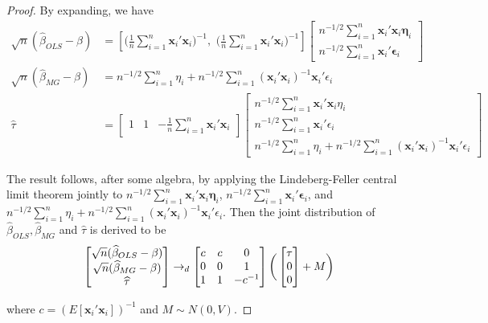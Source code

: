 \begin{proof}
By expanding, we have 
\begin{align*}
\sqrt{n} (\widehat{\beta}_{OLS} - \beta) & =  \left[\bigg(\frac{1}{n}\sum_{i=1}^{n} \mathbf{x}_i'  \mathbf{x}_i\bigg)^{-1}, \,\, \bigg(\frac{1}{n}\sum_{i=1}^{n} \mathbf{x}_i'  \mathbf{x}_i\bigg)^{-1} \right] \begin{bmatrix}
n^{-1/2}\sum_{i=1}^{n} \mathbf{x}_i'\mathbf{x}_i\mathbf{\eta}_i   \\
n^{-1/2}\sum_{i=1}^{n} \mathbf{x}_i'\mathbf{\epsilon}_i   
\end{bmatrix} \\
\sqrt{n} (\widehat{\beta}_{MG} - \beta)  &= n^{-1/2} \sum_{i=1}^n \eta_i + n^{-1/2} \sum_{i=1}^n (\mathbf{x}_i'\mathbf{x}_i)^{-1} \mathbf{x}_i'\epsilon_i \\
\widehat{\tau}  &=  \begin{bmatrix}
1 & 1& -\frac{1}{n}\sum_{i=1}^n \mathbf{x}_i'\mathbf{x}_i
\end{bmatrix} \begin{bmatrix}
n^{-1/2} \sum_{i=1}^n \mathbf{x}_i'\mathbf{x}_i \eta_i \\
n^{-1/2} \sum_{i=1}^n \mathbf{x}_i'\epsilon_i\\
n^{-1/2} \sum_{i=1}^n \eta_i + n^{-1/2} \sum_{i=1}^n (\mathbf{x}_i'\mathbf{x}_i)^{-1} \mathbf{x}_i'\epsilon_i 
\end{bmatrix}
\end{align*}

The result follows, after some algebra, by applying the Lindeberg-Feller central limit theorem jointly to $n^{-1/2}\sum_{i=1}^{n} \mathbf{x}_i'\mathbf{x}_i\mathbf{\eta}_i $, $n^{-1/2}\sum_{i=1}^{n} \mathbf{x}_i'\mathbf{\epsilon}_i$, and $n^{-1/2} \sum_{i=1}^n \eta_i + n^{-1/2} \sum_{i=1}^n (\mathbf{x}_i'\mathbf{x}_i)^{-1} \mathbf{x}_i'\epsilon_i $. Then the joint distribution of $\widehat{\beta}_{OLS}, \widehat{\beta}_{MG}$ and $\widehat{\tau}$ is derived to be 
\[
 \begin{bmatrix}
\sqrt{n} (\widehat{\beta}_{OLS} - \beta)\\
\sqrt{n} (\widehat{\beta}_{MG} - \beta)\\
\widehat{\tau}
\end{bmatrix} \rightarrow_d  \begin{bmatrix}
c & c & 0\\
0 &0 & 1\\
1 & 1& -c^{-1}
\end{bmatrix} \bigg(\begin{bmatrix}
\tau\\
0\\
0
\end{bmatrix}   + M  \bigg)\\
\]

where $c = (E[\mathbf{x}_i' \mathbf{x}_i])^{-1}$ and $M \sim N(0, V)$.
\end{proof}

